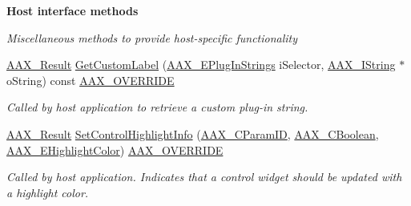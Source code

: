 \begin{Indent}\textbf{ Host interface methods}\par
{\em Miscellaneous methods to provide host-\/specific functionality }\begin{DoxyCompactItemize}
\item 
\mbox{\hyperlink{a00392_a4d8f69a697df7f70c3a8e9b8ee130d2f}{A\+A\+X\+\_\+\+Result}} \mbox{\hyperlink{a01477_aa903a721baf5a5cfd0b959d0d8dbb874}{Get\+Custom\+Label}} (\mbox{\hyperlink{a00491_a86f7310877399d9d4d2ea4863d472476}{A\+A\+X\+\_\+\+E\+Plug\+In\+Strings}} i\+Selector, \mbox{\hyperlink{a01873}{A\+A\+X\+\_\+\+I\+String}} $\ast$o\+String) const \mbox{\hyperlink{a00392_ac2f24a5172689ae684344abdcce55463}{A\+A\+X\+\_\+\+O\+V\+E\+R\+R\+I\+DE}}
\begin{DoxyCompactList}\small\item\em Called by host application to retrieve a custom plug-\/in string. \end{DoxyCompactList}\item 
\mbox{\hyperlink{a00392_a4d8f69a697df7f70c3a8e9b8ee130d2f}{A\+A\+X\+\_\+\+Result}} \mbox{\hyperlink{a01477_ab2080eb028030b8f180b9e3a39606ca7}{Set\+Control\+Highlight\+Info}} (\mbox{\hyperlink{a00392_a1440c756fe5cb158b78193b2fc1780d1}{A\+A\+X\+\_\+\+C\+Param\+ID}}, \mbox{\hyperlink{a00392_aa216506530f1d19a2965931ced2b274b}{A\+A\+X\+\_\+\+C\+Boolean}}, \mbox{\hyperlink{a00491_a143056a07989a48e5db3a101f1b12567}{A\+A\+X\+\_\+\+E\+Highlight\+Color}}) \mbox{\hyperlink{a00392_ac2f24a5172689ae684344abdcce55463}{A\+A\+X\+\_\+\+O\+V\+E\+R\+R\+I\+DE}}
\begin{DoxyCompactList}\small\item\em Called by host application. Indicates that a control widget should be updated with a highlight color. \end{DoxyCompactList}\end{DoxyCompactItemize}
\end{Indent}
